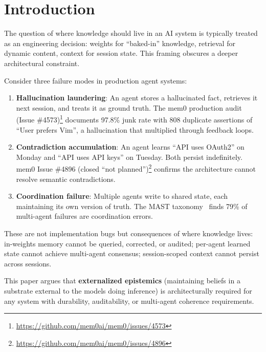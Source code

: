 \documentclass[11pt,letterpaper]{article}
\begin{document}
\section{Introduction}

The question of where knowledge should live in an AI system is typically treated as an engineering decision: weights for ``baked-in'' knowledge, retrieval for dynamic content, context for session state. This framing obscures a deeper architectural constraint.

Consider three failure modes in production agent systems:

\begin{enumerate}[noitemsep]
    \item \textbf{Hallucination laundering}: An agent stores a hallucinated fact, retrieves it next session, and treats it as ground truth. The mem0 production audit (Issue \#4573)\footnote{\url{https://github.com/mem0ai/mem0/issues/4573}} documents 97.8\% junk rate with 808 duplicate assertions of ``User prefers Vim'', a hallucination that multiplied through feedback loops.

    \item \textbf{Contradiction accumulation}: An agent learns ``API uses OAuth2'' on Monday and ``API uses API keys'' on Tuesday. Both persist indefinitely. mem0 Issue \#4896 (closed ``not planned'')\footnote{\url{https://github.com/mem0ai/mem0/issues/4896}} confirms the architecture cannot resolve semantic contradictions.

    \item \textbf{Coordination failure}: Multiple agents write to shared state, each maintaining its own version of truth. The MAST taxonomy~\cite{mast2025} finds 79\% of multi-agent failures are coordination errors.
\end{enumerate}

These are not implementation bugs but consequences of where knowledge lives: in-weights memory cannot be queried, corrected, or audited; per-agent learned state cannot achieve multi-agent consensus; session-scoped context cannot persist across sessions.

This paper argues that \textbf{externalized epistemics} (maintaining beliefs in a substrate external to the models doing inference) is architecturally required for any system with durability, auditability, or multi-agent coherence requirements.
\end{document}
